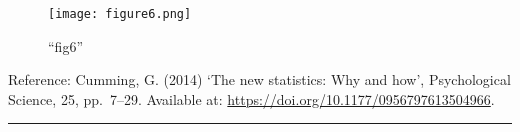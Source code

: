\documentclass[
]{article}
\begin{document}
\begin{figure}
\centering
\texttt{[image: figure6.png]}
\caption{``fig6''}
\end{figure}

Reference: Cumming, G. (2014) `The new statistics: Why and how',
Psychological Science, 25, pp.~7--29. Available at:
\url{https://doi.org/10.1177/0956797613504966}.

\begin{center}\rule{0.5\linewidth}{0.5pt}\end{center}
\end{document}
